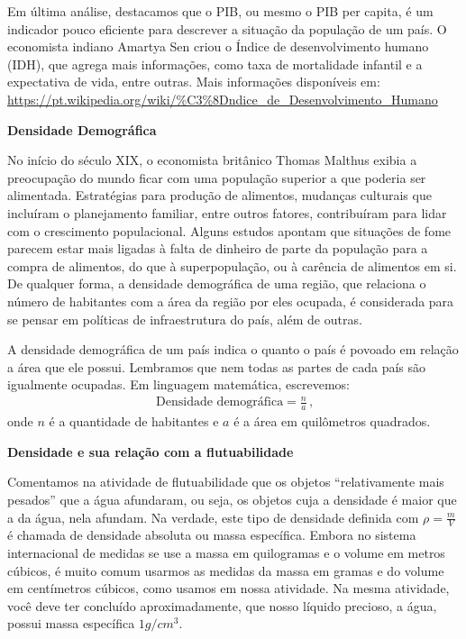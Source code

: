 Em última análise, destacamos que o PIB, ou mesmo o PIB per capita, é um indicador pouco eficiente para descrever a situação da  população de um país. O economista indiano Amartya Sen criou o Índice de desenvolvimento humano (IDH), que agrega mais informações, como taxa de mortalidade infantil e a expectativa de vida, entre outras. Mais informações disponíveis em: \url{https://pt.wikipedia.org/wiki/\%C3\%8Dndice\_de\_Desenvolvimento\_Humano}

\textbf{Densidade Demográfica}

No início do século XIX, o economista britânico Thomas Malthus exibia a preocupação do mundo ficar com uma população superior a que poderia ser alimentada. Estratégias para produção de alimentos, mudanças culturais que incluíram o planejamento familiar, entre outros fatores, contribuíram para lidar com o crescimento populacional. Alguns estudos apontam que situações de fome parecem estar mais ligadas à falta de dinheiro de parte da população para a compra de alimentos, do que à superpopulação, ou à carência de alimentos em si. De qualquer forma, a densidade demográfica de uma região, que relaciona o número de habitantes com a área da região por eles ocupada, é considerada para se pensar em políticas de infraestrutura do país, além de outras.

A densidade demográfica de um país indica o quanto o país é povoado em relação a área que ele possui. Lembramos que nem todas as partes de cada país são igualmente ocupadas. Em linguagem matemática, escrevemos:
\begin{equation*}
\begin{split}\text{Densidade demográfica} = \frac{n}{a} \, \text{,}\end{split}
\end{equation*}
onde $n$ é a quantidade de habitantes e $a$ é a área em quilômetros quadrados.

\textbf{Densidade e sua relação com a flutuabilidade}

Comentamos na atividade de flutuabilidade que os objetos “relativamente mais pesados” que a água afundaram, ou seja, os objetos cuja a densidade é maior que a da água, nela afundam. Na verdade, este tipo de densidade definida com $\rho = \frac{m}{V}$ é chamada de densidade absoluta ou massa específica. Embora no sistema internacional de medidas se use a massa em quilogramas e o volume em metros cúbicos, é  muito comum usarmos as medidas da massa em gramas e do volume em centímetros cúbicos, como usamos em nossa atividade. Na mesma atividade, você deve ter concluído aproximadamente, que nosso líquido precioso, a água, possui massa específica $1 g/cm^3$.


